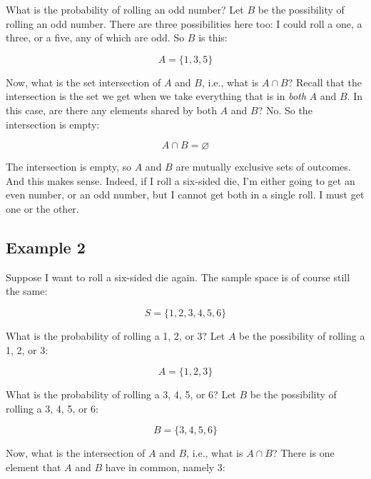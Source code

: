 \documentclass[../../../main.tex]{subfiles}
\begin{document}
\noindent
What is the probability of rolling an odd number? Let $B$ be the possibility of rolling an odd number. There are three possibilities here too: I could roll a one, a three, or a five, any of which are odd. So $B$ is this:

\begin{equation*}
  A = \{ 1, 3, 5 \}
\end{equation*}

\noindent
Now, what is the set intersection of $A$ and $B$, i.e., what is $A \cap B$? Recall that the intersection is the set we get when we take everything that is in \emph{both} $A$ and $B$. In this case, are there any elements shared by both $A$ and $B$? No. So the intersection is empty:

\begin{equation*}
  A \cap B = \varnothing
\end{equation*}

\noindent
The intersection is empty, so $A$ and $B$ are mutually exclusive sets of outcomes. And this makes sense. Indeed, if I roll a six-sided die, I'm either going to get an even number, or an odd number, but I cannot get both in a single roll.  I must get one or the other.



\subsection{Example 2}

Suppose I want to roll a six-sided die again. The sample space is of course still the same:

\begin{equation*}
  S = \{ 1, 2, 3, 4, 5, 6 \}
\end{equation*}

\noindent
What is the probability of rolling a 1, 2, or 3? Let $A$ be the possibility of rolling a 1, 2, or 3:

\begin{equation*}
  A = \{ 1, 2, 3 \}
\end{equation*}

\noindent
What is the probability of rolling a 3, 4, 5, or 6? Let $B$ be the possibility of rolling a 3, 4, 5, or 6:

\begin{equation*}
  B = \{ 3, 4, 5, 6 \}
\end{equation*}

\noindent
Now, what is the intersection of $A$ and $B$, i.e., what is $A \cap B$? There is one element that $A$ and $B$ have in common, namely 3:
\end{document}
